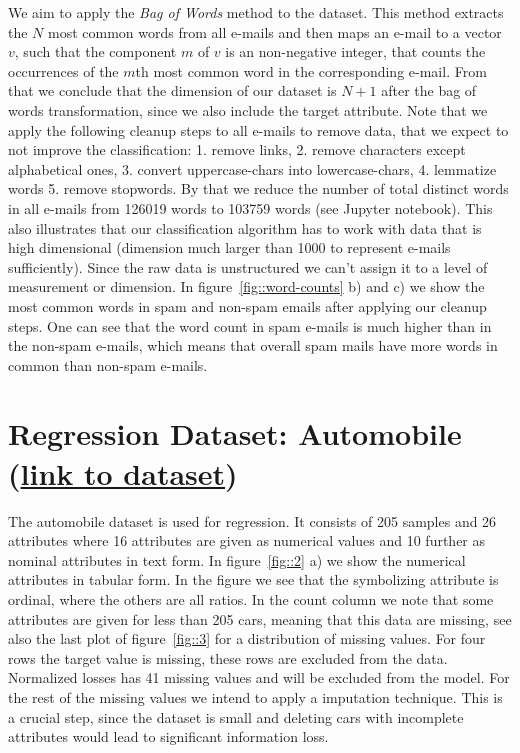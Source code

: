 \documentclass[11pt]{article}
\begin{document}
We aim to apply the \textit{Bag of Words} method to the dataset. This method extracts the $N$ most common words from all e-mails and then maps an e-mail to a vector $v$, such that the component $m$ of $v$ is an non-negative integer, that counts the occurrences of the $m$th most common word in the corresponding e-mail. From that we conclude that the dimension of our dataset is $N+1$ after the bag of words transformation, since we also include the target attribute. Note that we apply the following cleanup steps to all e-mails to remove data, that we expect to not improve the classification: 1. remove links, 2. remove characters except alphabetical ones, 3. convert uppercase-chars into lowercase-chars, 4. lemmatize words 5. remove stopwords. By that we reduce the number of total distinct words in all e-mails from 126019 words to 103759 words (see Jupyter notebook). This also illustrates that our classification algorithm has to work with data that is high dimensional (dimension much larger than 1000 to represent e-mails sufficiently). Since the raw data is unstructured we can't assign it to a level of measurement or dimension.       
%
In figure~\ref{fig::word-counts} b) and c) we show the most common words in spam and non-spam emails after applying our cleanup steps. One can see that the word count in spam e-mails is much higher than in the non-spam e-mails, which means that overall spam mails have more words in common than non-spam e-mails.  
%
\section{Regression Dataset: Automobile (\href{https://archive.ics.uci.edu/ml/datasets/automobile}{link to dataset})}
The automobile dataset is used for regression. It consists of 205 samples and 26 attributes where 16 attributes are given as numerical values and 10 further as nominal attributes in text form. In figure~\ref{fig::2} a) we show the numerical attributes in tabular form. In the figure we see that the symbolizing attribute is ordinal, where the others are all ratios. In the count column we note that some attributes are given for less than 205 cars, meaning that this data are missing, see also the last plot of figure~\ref{fig::3} for a distribution of missing values. For four rows the target value is missing, these rows are excluded from the data. Normalized losses has 41 missing values and will be excluded from the model. For the rest of the missing values we intend to apply a imputation technique. This is a crucial step, since the dataset is small and deleting cars with incomplete attributes would lead to significant information loss.%
  
\end{document}
